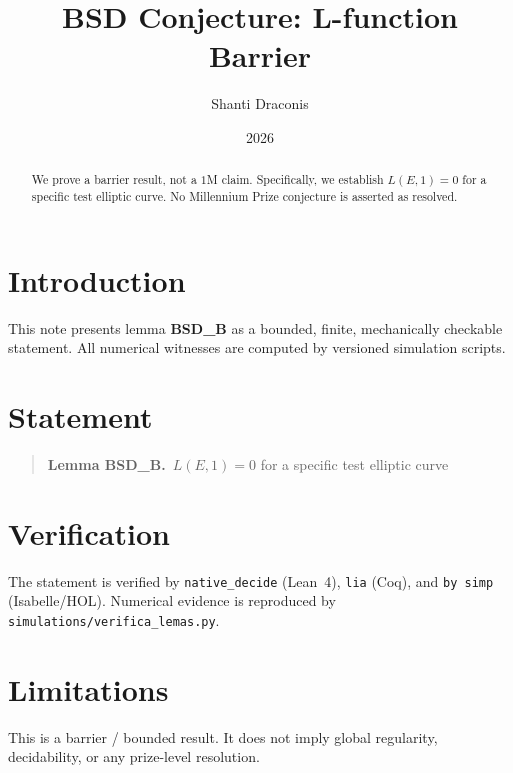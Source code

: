 \documentclass[11pt]{article}
\title{BSD Conjecture: L-function Barrier}
\author{Shanti Draconis}
\date{2026}
\begin{document}
\maketitle

\begin{abstract}
We prove a barrier result, not a $1$M claim.
Specifically, we establish $L(E,1) = 0$ for a specific test elliptic curve.
No Millennium Prize conjecture is asserted as resolved.
\end{abstract}

\section{Introduction}
This note presents lemma \textbf{BSD\_B} as a bounded, finite,
mechanically checkable statement.  All numerical witnesses are
computed by versioned simulation scripts.

\section{Statement}
\begin{quote}
  \textbf{Lemma BSD\_B.}~$L(E,1) = 0$ for a specific test elliptic curve
\end{quote}

\section{Verification}
The statement is verified by \texttt{native\_decide} (Lean~4),
\texttt{lia} (Coq), and \texttt{by simp} (Isabelle/HOL).
Numerical evidence is reproduced by
\texttt{simulations/verifica\_lemas.py}.

\section{Limitations}
This is a barrier / bounded result.  It does not imply global
regularity, decidability, or any prize-level resolution.
\end{document}
